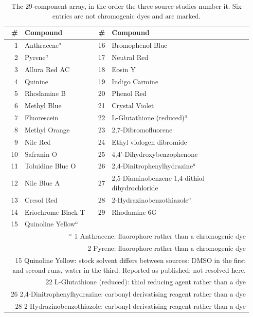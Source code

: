 \begin{table}[htb]
\centering
\caption{The 29-component array, in the order the three source studies number it. Six entries are not chromogenic dyes and are marked.}
\label{tab:dyepanel}
\small
\begin{tabular}{rlrl}
\hline
\# & Compound & \# & Compound \\
\hline
1 & Anthracene$^{a}$ & 16 & Bromophenol Blue \\
2 & Pyrene$^{a}$ & 17 & Neutral Red \\
3 & Allura Red AC & 18 & Eosin Y \\
4 & Quinine & 19 & Indigo Carmine \\
5 & Rhodamine B & 20 & Phenol Red \\
6 & Methyl Blue & 21 & Crystal Violet \\
7 & Fluorescein & 22 & L-Glutathione (reduced)$^{a}$ \\
8 & Methyl Orange & 23 & 2,7-Dibromofluorene \\
9 & Nile Red & 24 & Ethyl viologen dibromide \\
10 & Safranin O & 25 & 4,4'-Dihydroxybenzophenone \\
11 & Toluidine Blue O & 26 & 2,4-Dinitrophenylhydrazine$^{a}$ \\
12 & Nile Blue A & 27 & 2,5-Diaminobenzene-1,4-dithiol dihydrochloride \\
13 & Cresol Red & 28 & 2-Hydrazinobenzothiazole$^{a}$ \\
14 & Eriochrome Black T & 29 & Rhodamine 6G \\
15 & Quinoline Yellow$^{a}$ &  &  \\
\hline
\multicolumn{4}{p{13cm}}{\footnotesize $^{a}$ 1 Anthracene: fluorophore rather than a chromogenic dye}\\
\multicolumn{4}{p{13cm}}{\footnotesize 2 Pyrene: fluorophore rather than a chromogenic dye}\\
\multicolumn{4}{p{13cm}}{\footnotesize 15 Quinoline Yellow: stock solvent differs between sources: DMSO in the first and second runs, water in the third. Reported as published; not resolved here.}\\
\multicolumn{4}{p{13cm}}{\footnotesize 22 L-Glutathione (reduced): thiol reducing agent rather than a dye}\\
\multicolumn{4}{p{13cm}}{\footnotesize 26 2,4-Dinitrophenylhydrazine: carbonyl derivatising reagent rather than a dye}\\
\multicolumn{4}{p{13cm}}{\footnotesize 28 2-Hydrazinobenzothiazole: carbonyl derivatising reagent rather than a dye}\\
\end{tabular}
\end{table}
